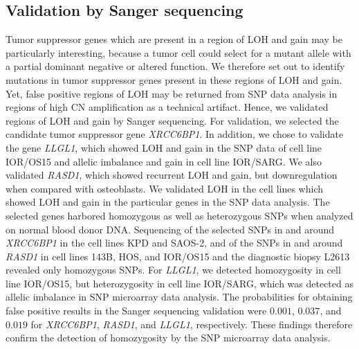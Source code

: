 \subsection{Validation by Sanger sequencing}
Tumor suppressor genes which are present in a region of LOH and gain may be particularly interesting, because a tumor cell could select for a mutant allele with a partial dominant negative or altered function. We therefore set out to identify mutations in tumor suppressor genes present in these regions of LOH and gain. Yet, false positive regions of LOH may be returned from SNP data analysis in regions of high CN amplification as a technical artifact. Hence, we validated regions of LOH and gain by Sanger sequencing. For validation, we selected the candidate tumor suppressor gene {\it XRCC6BP1}. In addition, we chose to validate the gene {\it LLGL1}, which showed LOH and gain in the SNP data of cell line IOR/OS15 and allelic imbalance and gain in cell line IOR/SARG. We also validated {\it RASD1}, which showed recurrent LOH and gain, but downregulation when compared with osteoblasts. We validated LOH in the cell lines which showed LOH and gain in the particular genes in the SNP data analysis. The selected genes harbored homozygous as well as heterozygous SNPs when analyzed on normal blood donor DNA. Sequencing of the selected SNPs in and around {\it XRCC6BP1} in the cell lines KPD and SAOS-2, and of the SNPs in and around {\it RASD1} in cell lines 143B, HOS, and IOR/OS15 and the diagnostic biopsy L2613 revealed only homozygous SNPs. For {\it LLGL1}, we detected homozygosity in cell line IOR/OS15, but heterozygosity in cell line IOR/SARG, which was detected as allelic imbalance in SNP microarray data analysis. The probabilities for obtaining false positive results in the Sanger sequencing validation were $0.001$, $0.037$, and $0.019$ for {\it XRCC6BP1}, {\it RASD1}, and {\it LLGL1}, respectively. These findings therefore confirm the detection of homozygosity by the SNP microarray data analysis.

